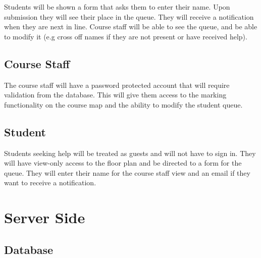 \documentclass{article}
\begin{document}
Students will be shown a form that asks them to enter their name. Upon submission they will see their place in the queue. They will receive a notification when they are next in line. Course staff will be able to see the queue, and be able to modify it (e.g cross off names if they are not present or have received help).

\subsection*{Course Staff}

The course staff will have a password protected account that will require validation from the database. This will give them access to the marking functionality on the course map and the ability to modify the student queue.

\subsection*{Student}

Students seeking help will be treated as guests and will not have to sign in. They will have view-only access to the floor plan and be directed to a form for the queue. They will enter their name for the course staff view and an email if they want to receive a notification.

\section*{Server Side}

\subsection*{Database}
\end{document}
